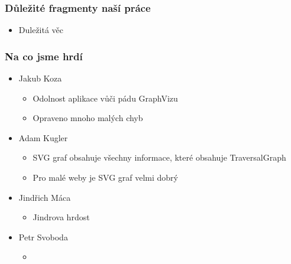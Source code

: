 \documentclass{beamer}
\begin{document}
\begin{frame}[allowframebreaks]\frametitle{Důležité fragmenty naší práce}
  \begin{itemize}
    \item Duležitá věc %
  \end{itemize}
\end{frame}

\begin{frame}[allowframebreaks]\frametitle{Na co jsme hrdí} 
  \begin{itemize}
    \item Jakub Koza
      \begin{itemize}
       \item Odolnost aplikace vůči pádu GraphVizu
       \item Opraveno mnoho malých chyb
     \end{itemize}
   
    \item Adam Kugler
      \begin{itemize}
       \item SVG graf obsahuje všechny informace, které obsahuje TraversalGraph
       \item Pro malé weby je SVG graf velmi dobrý
     \end{itemize}

    \item Jindřich Máca
      \begin{itemize}
       \item Jindrova hrdost
      \end{itemize}  
   
    \item Petr Svoboda
      \begin{itemize}
       \item 
     \end{itemize}
   \end{itemize}  
\end{frame}
\end{document}
